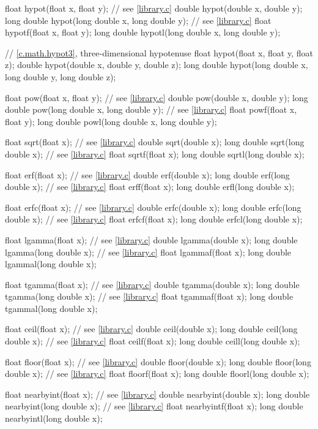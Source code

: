 \begin{codeblock}
{  float hypot(float x, float y);  // see \ref{library.c}
  double hypot(double x, double y);
  long double hypot(long double x, long double y);  // see \ref{library.c}
  float hypotf(float x, float y);
  long double hypotl(long double x, long double y);

  // \ref{c.math.hypot3}, three-dimensional hypotenuse
  float hypot(float x, float y, float z);
  double hypot(double x, double y, double z);
  long double hypot(long double x, long double y, long double z);

  float pow(float x, float y);  // see \ref{library.c}
  double pow(double x, double y);
  long double pow(long double x, long double y);  // see \ref{library.c}
  float powf(float x, float y);
  long double powl(long double x, long double y);

  float sqrt(float x);  // see \ref{library.c}
  double sqrt(double x);
  long double sqrt(long double x);  // see \ref{library.c}
  float sqrtf(float x);
  long double sqrtl(long double x);

  float erf(float x);  // see \ref{library.c}
  double erf(double x);
  long double erf(long double x);  // see \ref{library.c}
  float erff(float x);
  long double erfl(long double x);

  float erfc(float x);  // see \ref{library.c}
  double erfc(double x);
  long double erfc(long double x);  // see \ref{library.c}
  float erfcf(float x);
  long double erfcl(long double x);

  float lgamma(float x);  // see \ref{library.c}
  double lgamma(double x);
  long double lgamma(long double x);  // see \ref{library.c}
  float lgammaf(float x);
  long double lgammal(long double x);

  float tgamma(float x);  // see \ref{library.c}
  double tgamma(double x);
  long double tgamma(long double x);  // see \ref{library.c}
  float tgammaf(float x);
  long double tgammal(long double x);

  float ceil(float x);  // see \ref{library.c}
  double ceil(double x);
  long double ceil(long double x);  // see \ref{library.c}
  float ceilf(float x);
  long double ceill(long double x);

  float floor(float x);  // see \ref{library.c}
  double floor(double x);
  long double floor(long double x);  // see \ref{library.c}
  float floorf(float x);
  long double floorl(long double x);

  float nearbyint(float x);  // see \ref{library.c}
  double nearbyint(double x);
  long double nearbyint(long double x);  // see \ref{library.c}
  float nearbyintf(float x);
  long double nearbyintl(long double x);

}
\end{codeblock}
